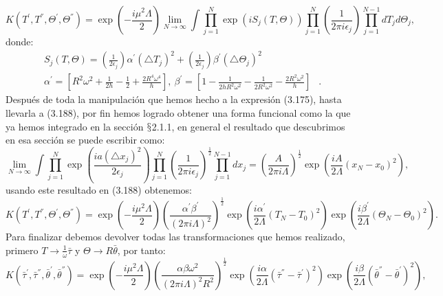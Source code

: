 \begin{equation}
K(T^{'},T^{''},\Theta^{'},\Theta^{''})=\exp\left(-\frac{i\mu^{2}\Lambda}{2}\right)\lim_{N\to\infty}\int\prod_{j=1}^{N}\exp(iS_{j}(T,\Theta))\prod_{j=1}^{N}\left(\frac{1}{2\pi i\epsilon_{j}}\right)\prod_{j=1}^{N-1}dT_{j}d\Theta_{j},
\end{equation}
donde:
\begin{eqnarray}
\nonumber &S_{j}(T,\Theta)=\left(\frac{1}{2\epsilon_{j}}\right)\alpha^{'}(\triangle T_{j})^{2}+\left(\frac{1}{2\epsilon_{j}}\right)\beta^{'}(\triangle\Theta_{j})^{2}&\\
&\alpha^{'}=\left[R^{2}\omega^{2}+\frac{1}{2h}-\frac{1}{2}+\frac{2R^{4}\omega^{4}}{h}\right],\ \beta^{'}=\left[1-\frac{1}{2hR^{2}\omega^{2}}-\frac{1}{2R^{2}\omega^{2}}-\frac{2R^{2}\omega^{2}}{h}\right]&.
\end{eqnarray}
Después de toda la manipulación que hemos hecho a la expresión (3.175), hasta llevarla a (3.188), por fin hemos logrado obtener una forma funcional como la que ya hemos integrado en la sección $\mathsection$2.1.1, en general el resultado que descubrimos en esa sección se puede escribir como:
\begin{equation}
\lim_{N\to\infty}\int\prod_{j=1}^{N}\exp\left(\frac{ia(\triangle x_{j})^{2}}{2\epsilon_{j}}\right)\prod_{j=1}^{N}\left(\frac{1}{2\pi i\epsilon_{j}}\right)^{\frac{1}{2}}\prod_{j=1}^{N-1}dx_{j}=\left(\frac{A}{2\pi i\Lambda}\right)^{\frac{1}{2}}\exp\left(\frac{iA}{2\Lambda}(x_{N}-x_{0})^{2}\right),
\end{equation}
usando este resultado en (3.188) obtenemos:
\begin{equation}
K(T^{'},T^{''},\Theta^{'},\Theta^{''})=\exp\left(-\frac{i\mu^{2}\Lambda}{2}\right)\left(\frac{\alpha^{'}\beta^{'}}{(2\pi i\Lambda)^{2}}\right)^{\frac{1}{2}}\exp\left(\frac{i\alpha^{'}}{2\Lambda}(T_{N}-T_{0})^{2}\right)\exp\left(\frac{i\beta^{'}}{2\Lambda}(\Theta{}_{N}-\Theta_{0})^{2}\right).
\end{equation}
Para finalizar debemos devolver todas las transformaciones que hemos realizado, primero $T\to\frac{1}{\omega}\bar{\tau}$ y $\Theta\to R\bar{\theta}$, por tanto:
\begin{equation}
K(\bar{\tau}^{'},\bar{\tau}^{''},\bar{\theta}^{'},\bar{\theta}^{''})=\exp\left(-\frac{i\mu^{2}\Lambda}{2}\right)\left(\frac{\alpha\beta\omega^2}{(2\pi i\Lambda)^{2}R^2}\right)^{\frac{1}{2}}\exp\left(\frac{i\alpha}{2\Lambda}(\bar{\tau}^{''}-\bar{\tau}^{'})^{2}\right)\exp\left(\frac{i\beta}{2\Lambda}(\bar{\theta}^{''}-\bar{\theta}^{'})^{2}\right),
\end{equation}
